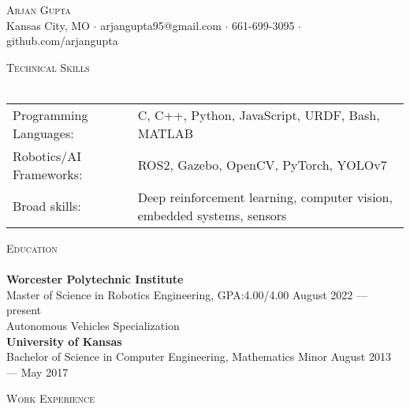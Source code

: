 \documentclass[a4paper]{article}
\newcommand{\lineunder} {
    \vspace*{-8pt} \\
    \hspace*{-18pt} \hrulefill \\
}
\newcommand{\header} [1] {
    {\hspace*{-18pt}\vspace*{6pt} \textsc{#1}}
    \vspace*{-6pt} \lineunder
}
\begin{document}
\vspace*{-40pt}

    

\vspace*{-10pt}
\begin{center}
	{\Huge \scshape {Arjan Gupta}}\\
	Kansas City, MO $\cdot$ arjangupta95@gmail.com $\cdot$ 661-699-3095 $\cdot$ github.com/arjangupta\\
\end{center}

\header{Technical Skills}
\vspace{2mm}
\begin{tabular}{ l l }
	Programming Languages: & C, C++, Python, JavaScript, URDF, Bash, MATLAB \\
    Robotics/AI Frameworks:   & ROS2, Gazebo, OpenCV, PyTorch, YOLOv7 \\
    Broad skills: & Deep reinforcement learning, computer vision, embedded systems, sensors
\end{tabular}
\vspace{2mm}

\header{Education}
\textbf{Worcester Polytechnic Institute}\\
Master of Science in Robotics Engineering, GPA:\@ 4.00/4.00 \hfill August 2022 --- present\\
Autonomous Vehicles Specialization\\
\vspace{2mm}
\textbf{University of Kansas}\\
Bachelor of Science in Computer Engineering, Mathematics Minor \hfill August 2013 --- May 2017\\

\vspace{3mm}

\header{Work Experience}
\vspace{1mm}
\end{document}
